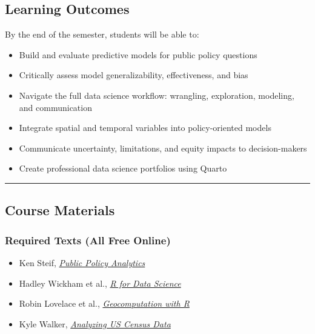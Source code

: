 \documentclass[
  11pt,
]{article}
\providecommand{\tightlist}{%
  \setlength{\itemsep}{0pt}\setlength{\parskip}{0pt}}
\begin{document}
\subsection{Learning Outcomes}\label{learning-outcomes}

By the end of the semester, students will be able to:

\begin{itemize}
\tightlist
\item
  Build and evaluate predictive models for public policy questions
\item
  Critically assess model generalizability, effectiveness, and bias
\item
  Navigate the full data science workflow: wrangling, exploration,
  modeling, and communication
\item
  Integrate spatial and temporal variables into policy-oriented models
\item
  Communicate uncertainty, limitations, and equity impacts to
  decision-makers
\item
  Create professional data science portfolios using Quarto
\end{itemize}

\begin{center}\rule{0.5\linewidth}{0.5pt}\end{center}

\subsection{Course Materials}\label{course-materials}

\subsubsection{Required Texts (All Free
Online)}\label{required-texts-all-free-online}

\begin{itemize}
\tightlist
\item
  Ken Steif,
  \href{https://urbanspatial.github.io/PublicPolicyAnalytics/}{\emph{Public
  Policy Analytics}}
\item
  Hadley Wickham et al., \href{https://r4ds.hadley.nz/}{\emph{R for Data
  Science}}
\item
  Robin Lovelace et al.,
  \href{https://r.geocompx.org/}{\emph{Geocomputation with R}}
\item
  Kyle Walker, \href{https://walker-data.com/census-r/}{\emph{Analyzing
  US Census Data}}
\end{itemize}
\end{document}
